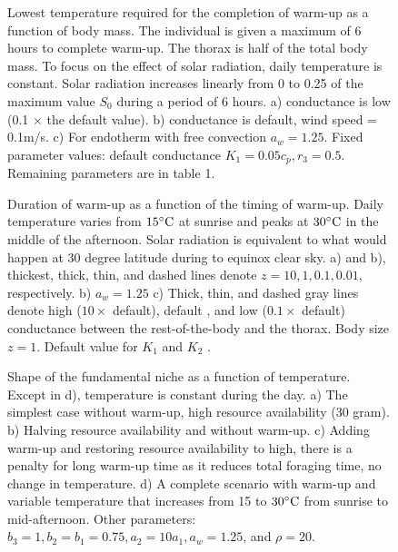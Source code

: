\vspace{-1.5cm}
%
\begin{figure}[H]
\begin{center}
\caption{
	Lowest temperature required for the completion of warm-up as a function of body mass.
	The individual is given a maximum of 6 hours to complete warm-up.
	The thorax is half of the total body mass.
	To focus on the effect of solar radiation, daily temperature is constant.
	Solar radiation increases linearly from 0 to 0.25 of the maximum value $S_0$ during a period of 6 hours. 
	a) conductance is low (0.1 $\times$ the default value).
	b) conductance is default, wind speed  = 0.1m/s.
	c) For endotherm with free convection $a_w = 1.25$. 
	Fixed parameter values: default conductance $K_1 = 0.05 c_p, r_3 = 0.5$.
	Remaining parameters are in table 1.
}%
\label{fig4}
\end{center}
\end{figure}
\vspace{-1.5cm}
%
\begin{figure}[H]
\begin{center}
\caption{
	Duration of warm-up as a function of the timing of warm-up.
	Daily temperature varies from $15^{\circ}\rm{C}$ at sunrise and peaks at $30^{\circ}\rm{C}$ in the middle of the afternoon.
	Solar radiation is equivalent to what would happen at 30 degree latitude during to equinox clear sky.
	a) and b), thickest, thick, thin, and dashed lines denote  $z = 10, 1, 0.1, 0.01$,  respectively.
	b) $a_w = 1.25$
	c) Thick, thin, and dashed gray lines denote high ($10 \times $ default), default , and low ($0.1 \times$ default) conductance between the rest-of-the-body and the thorax. 
	Body size $z = 1$.
	Default value for $K_1$ and $K_2$ .	
}%
\label{fig5}
\end{center}
\end{figure}
\vspace{-1.5cm}
\begin{figure}[H]
\begin{center}
\caption{
	Shape of the fundamental niche as a function of temperature.
	Except in d),  temperature is constant during the day.
	a) The simplest case without warm-up, high resource availability (30 gram).
	b) Halving resource availability and without warm-up.
	c) Adding warm-up and  restoring resource availability to high, there is a penalty for long warm-up time as it reduces total foraging time, no change in temperature.
	d) A complete  scenario with warm-up and variable temperature that increases from 15 to $30^{\circ} \rm{C}$ from sunrise to mid-afternoon.
	Other parameters: $b_3 = 1, b_2 = b_1  = 0.75,  a_2 = 10 a_1, a_w = 1.25$, and  $\rho = 20$.
}%
\label{fig6}
\end{center}
\end{figure}
%